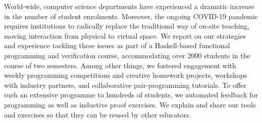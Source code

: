 World-wide, computer science departments have experienced a dramatic increase in the number of student enrolments.
Moreover, the ongoing COVID-19 pandemic requires institutions to radically replace the traditional way of on-site teaching,
moving interaction from physical to virtual space.
We report on our strategies and experience tackling these issues
as part of a Haskell-based functional programming and verification course,
accommodating over 2000 students in the course of two semesters.
Among other things,
we fostered engagement with weekly programming competitions
and creative homework projects,
workshops with industry partners,
and collaborative pair-programming tutorials.
To offer such an extensive programme to hundreds of students,
we automated feedback for programming as well as
inductive proof exercises.
We explain and share our tools and exercises so that they can be reused by other educators.

